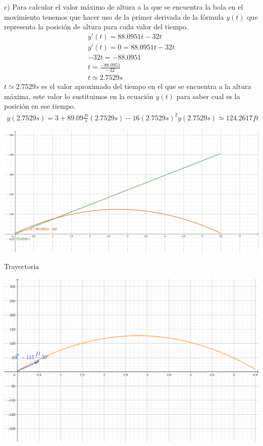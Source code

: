     \vspace{5mm} %
    
    c) Para calcular el valor máximo de altura a la que se encuentra la bola en el movimiento tenemos que hacer uso de la primer derivada de la fórmula $y(t)$ que representa la posición de altura para cada valor del tiempo.
    \begin{gather*}
        y'(t)=88.0951t-32t\\
        y'(t)=0=88.0951t-32t\\
        -32t=-88.0951\\
        t=\frac{-88.0951}{-32}\\
        t\simeq 2.7529s
    \end{gather*}
    $t\simeq 2.7529s$ es el valor aproximado del tiempo en el que se encuentra a la altura máxima, este valor lo sustituimos en la ecuación $y(t)$ para saber cual es la posición en ese tiempo.
    \begin{gather*}
        y(2.7529s)=3+89.09\frac{ft}{s}(2.7529s)-16(2.7529s)^2
        y(2.7529s)\simeq 124.2617ft
    \end{gather*}

    \begin{center}
        \includegraphics[height = 0.3\textheight]{recursos/geogebra-export(1).png}\par
    \end{center}
    Trayectoria    
    \begin{center}
        \includegraphics[height = 0.3\textheight]{recursos/geogebra-export(2).png}\par
    \end{center}
